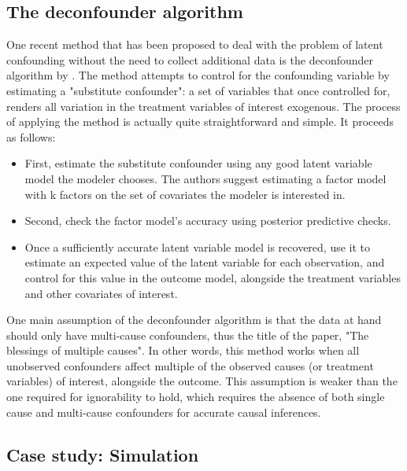 \subsection{The deconfounder algorithm}
\label{sec:deconfounder-algo}



One recent method that has been proposed to deal with the problem of latent
confounding without the need to collect additional data is the deconfounder
algorithm by \citet{wang_2019_blessings}. The method attempts to control for the
confounding variable by estimating a "substitute confounder": a set of variables
that once controlled for, renders all variation in the treatment variables of
interest exogenous. The process of applying the method is actually quite
straightforward and simple. It proceeds as follows:
\begin{itemize}
	\item First, estimate the substitute confounder using any good latent variable
	model the modeler chooses. The authors suggest estimating a factor model
	with k factors on the set of covariates the modeler is interested in.
	\item Second, check the factor model's accuracy using posterior predictive
	checks.
	\item Once a sufficiently accurate latent variable model is recovered, use it
	to estimate an expected value of the latent variable for each observation,
	and control for this value in the outcome model, alongside the treatment
	variables and other covariates of interest.
\end{itemize}



One main assumption of the deconfounder algorithm is that the data at hand
should only have multi-cause confounders, thus the title of the paper, "The
blessings of multiple causes". In other words, this method works when all
unobserved confounders affect multiple of the observed causes (or treatment
variables) of interest, alongside the outcome. This assumption is weaker than
the one required for ignorability to hold, which requires the absence of both
single cause and multi-cause confounders for accurate causal inferences.



\subsection{Case study: Simulation}
\label{sec:deconfounder-simulation}

